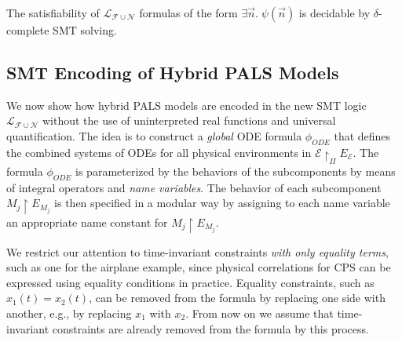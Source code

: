 \begin{theorem}
The satisfiability of $\mathcal{L}_{\mathcal{F}\cup\mathcal{N}}$ formulas of the form $\exists \vec{n}.\; \psi(\vec{n})$
is decidable by  $\delta$-complete SMT solving. 
\end{theorem}









\subsection{SMT Encoding of Hybrid PALS Models}


We now show how hybrid PALS models
are encoded in the new SMT logic $\mathcal{L}_{\mathcal{F}\cup\mathcal{N}}$
without the use of uninterpreted real functions and universal quantification.
The idea is to construct a \emph{global} ODE formula $\phi_{\mathit{ODE}}$
that defines the combined systems of ODEs for all physical environments
in $\mathcal{E} \restriction_{\Pi} E_\mathcal{E}$.
The formula $\phi_{\mathit{ODE}}$ is parameterized by the behaviors of 
the subcomponents by means of integral operators and \emph{name variables}.
The behavior of each subcomponent $M_j \restriction E_{M_j}$ is then
specified in a modular way by assigning to each name variable an appropriate name constant for $M_j \restriction E_{M_j}$.

We restrict our attention to time-invariant constraints \emph{with only equality terms},
such as one for the airplane example,
since physical correlations for CPS can be expressed using equality conditions in practice.
Equality  constraints, such as $x_1(t) = x_2(t)$,  can be removed
from the formula  by replacing one side with another, e.g., by replacing $x_1$ with  $x_2$.
From now on we assume that time-invariant constraints are already removed from the formula 
by this process.



